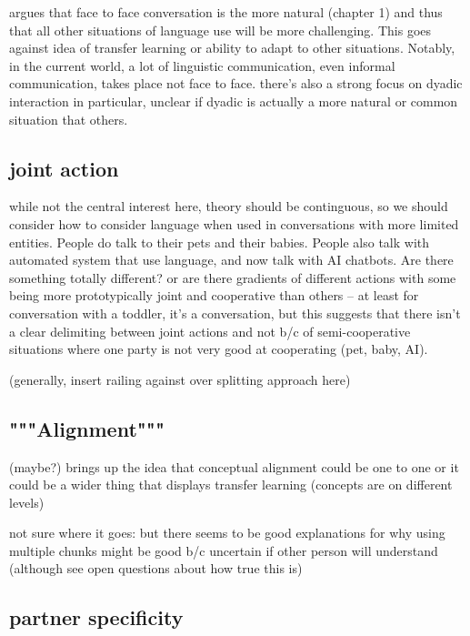 \documentclass[]{article}
\begin{document}
\cite{clark1996} argues that face to face conversation is the more natural (chapter 1) and thus that all other situations of language use will be more challenging. This goes against idea of transfer learning or ability to adapt to other situations. Notably, in the current world, a lot of linguistic communication, even informal communication, takes place not face to face. there's also a strong focus on dyadic interaction in particular, unclear if dyadic is actually a more natural or common situation that others.

\subsection{joint action}
\cite{clark1996} while not the central interest here, theory should be continguous, so we should consider how to consider language when used in conversations with more limited entities. People do talk to their pets and their babies. People also talk with automated system that use language, and now talk with AI chatbots. Are there something totally different? or are there gradients of different actions with some being more prototypically joint and cooperative than others -- at least for conversation with a toddler, it's a conversation, but this suggests that there isn't a clear delimiting between joint actions and not b/c of semi-cooperative situations where one party is not very good at cooperating (pet, baby, AI). 

(generally, insert railing against over splitting approach here)


\subsection{"""Alignment"""}

\cite{eliav2023} (maybe?) brings up the idea that conceptual alignment could be one to one or it could be a wider thing that displays transfer learning (concepts are on different levels) 

not sure where it goes: but there seems to be good explanations for why using multiple chunks might be good b/c uncertain if other person will understand (although see open questions about how true this is) 



\subsection{partner specificity}
\end{document}
